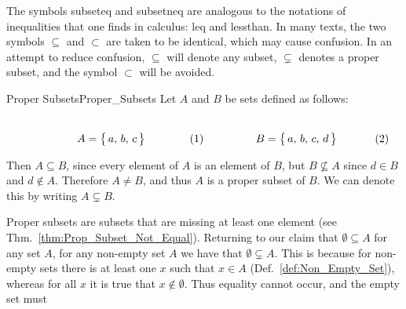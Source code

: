         The symbols \gls{subseteq} and \gls{subsetneq} are analogous to the
        notations of inequalities that one finds in calculus: \gls{leq} and
        \gls{lessthan}. In many texts, the two symbols $\subseteq$ and $\subset$
        are taken to be identical, which may cause confusion. In an attempt to
        reduce confusion, $\subseteq$ will denote any subset, $\subsetneq$
        denotes a proper subset, and the symbol $\subset$ will be avoided.
        \begin{lexample}{Proper Subsets}{Proper_Subsets}
            Let $A$ and $B$ be sets defined as follows:
            \par
            \begin{subequations}
                \begin{minipage}[b]{0.49\textwidth}
                    \centering
                    \begin{equation}
                        A=\big\{\,a,\,b,\,c\,\big\}
                    \end{equation}
                \end{minipage}
                \hfill
                \begin{minipage}[b]{0.49\textwidth}
                    \centering
                    \begin{equation}
                        B=\big\{\,a,\,b,\,c,\,d\,\big\}
                    \end{equation}
                \end{minipage}
            \end{subequations}
            \par\vspace{2.5ex}
            Then $A\subseteq{B}$, since every element of $A$ is an element of
            $B$, but $B\nsubseteq{A}$ since $d\in{B}$ and $d\notin{A}$.
            Therefore $A\ne{B}$, and thus $A$ is a proper subset of $B$. We can
            denote this by writing $A\subsetneq{B}$.
        \end{lexample}
        Proper subsets are subsets that are missing at least one element
        (see Thm.~\ref{thm:Prop_Subset_Not_Equal}). Returning to our claim that
        $\emptyset\subseteq{A}$ for any set $A$, for any non-empty set $A$ we
        have that $\emptyset\subsetneq{A}$. This is because for non-empty sets
        there is at least one $x$ such that $x\in{A}$
        (Def.~\ref{def:Non_Empty_Set}), whereas for all $x$ it is true that
        $x\notin\emptyset$. Thus equality cannot occur, and the empty set must
